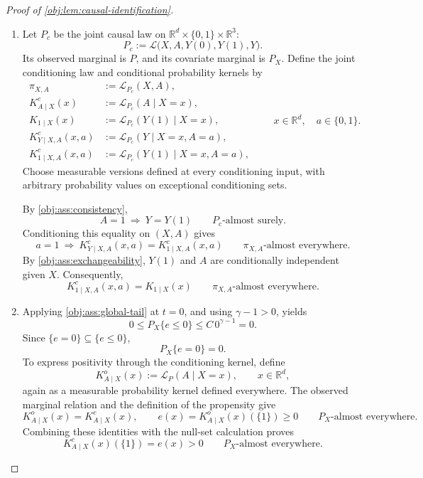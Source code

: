\documentclass[11pt]{article}
\begin{document}
\begin{proof}[Proof of \cref{obj:lem:causal-identification}]
\begin{enumerate}
\item Let \(P_c\) be the joint causal law on
\(\mathbb R^d\times\{0,1\}\times\mathbb R^3\):
\[
P_c:=\mathcal L\bigl(X,A,Y(0),Y(1),Y\bigr).
\]
Its observed marginal is \(P\), and its covariate marginal is \(P_X\). Define the joint conditioning law and conditional probability kernels by
\[
\begin{aligned}
\pi_{X,A}&:=\mathcal L_{P_c}(X,A),\\
K^c_{A\mid X}(x)&:=\mathcal L_{P_c}(A\mid X=x),\\
K_{1\mid X}(x)&:=\mathcal L_{P_c}(Y(1)\mid X=x),\\
K^c_{Y\mid X,A}(x,a)&:=\mathcal L_{P_c}(Y\mid X=x,A=a),\\
K^c_{1\mid X,A}(x,a)&:=\mathcal L_{P_c}(Y(1)\mid X=x,A=a),
\end{aligned}
\qquad x\in\mathbb R^d,\quad a\in\{0,1\}.
\]
Choose measurable versions defined at every conditioning input, with arbitrary probability values on exceptional conditioning sets.

By \cref{obj:ass:consistency},
\[
A=1\ \Longrightarrow\ Y=Y(1)
\qquad P_c\text{-almost surely}.
\]
Conditioning this equality on \((X,A)\) gives
\[
a=1\ \Longrightarrow\
K^c_{Y\mid X,A}(x,a)=K^c_{1\mid X,A}(x,a)
\qquad \pi_{X,A}\text{-almost everywhere}.
\]
By \cref{obj:ass:exchangeability}, \(Y(1)\) and \(A\) are conditionally independent given \(X\). Consequently,
\[
K^c_{1\mid X,A}(x,a)=K_{1\mid X}(x)
\qquad \pi_{X,A}\text{-almost everywhere}.
\]

\item Applying \cref{obj:ass:global-tail} at \(t=0\), and using \(\gamma-1>0\), yields
\[
0\le P_X\{e\le0\}\le C\,0^{\gamma-1}=0.
\]
Since \(\{e=0\}\subseteq\{e\le0\}\),
\[
P_X\{e=0\}=0.
\]
To express positivity through the conditioning kernel, define
\[
K^o_{A\mid X}(x):=\mathcal L_P(A\mid X=x),
\qquad x\in\mathbb R^d,
\]
again as a measurable probability kernel defined everywhere. The observed marginal relation and the definition of the propensity give
\[
K^o_{A\mid X}(x)=K^c_{A\mid X}(x),
\qquad
e(x)=K^o_{A\mid X}(x)(\{1\})\ge0
\qquad P_X\text{-almost everywhere}.
\]
Combining these identities with the null-set calculation proves
\[
K^c_{A\mid X}(x)(\{1\})=e(x)>0
\qquad P_X\text{-almost everywhere}.
\]


\end{enumerate}
\end{proof}
\end{document}
